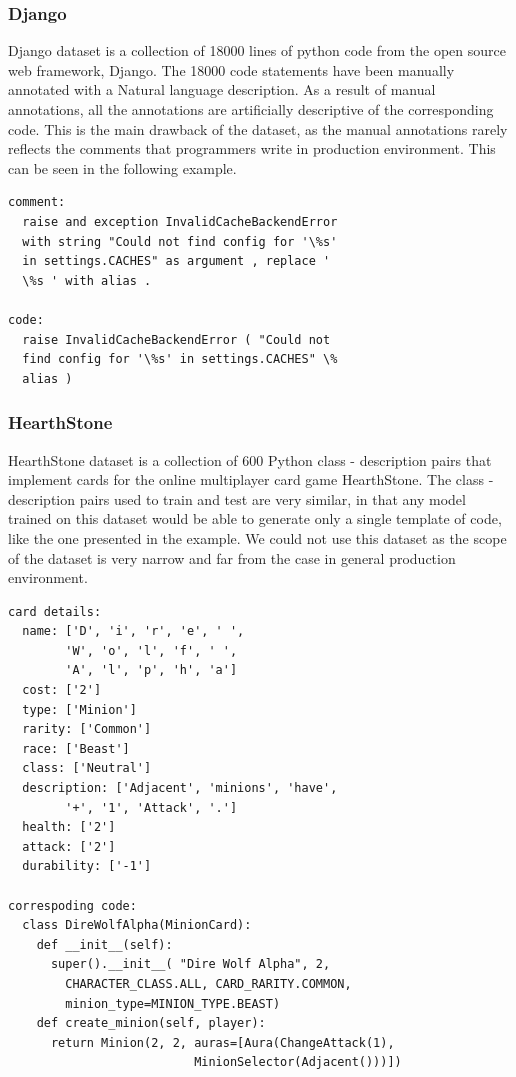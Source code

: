 \documentclass{IEEEtran}
\begin{document}
        \subsubsection{Django}
        Django dataset is a collection of 18000 lines of python code from the open source
        web framework, Django. The 18000 code statements have been manually annotated
        with a Natural language description. As a result of manual annotations, all the
        annotations are artificially descriptive of the corresponding code. This is
        the main drawback of the dataset, as the manual annotations rarely reflects
        the comments that programmers write in production environment. This can be seen
        in the following example.

        \begin{lstlisting}[frame=single,basicstyle=\small]
comment:
  raise and exception InvalidCacheBackendError 
  with string "Could not find config for '\%s' 
  in settings.CACHES" as argument , replace ' 
  \%s ' with alias .

code:
  raise InvalidCacheBackendError ( "Could not 
  find config for '\%s' in settings.CACHES" \% 
  alias )
        \end{lstlisting}

        \subsubsection{HearthStone}
        HearthStone dataset is a collection of 600 Python class - description pairs
        that implement cards for the online multiplayer card game HearthStone.
        The class - description pairs used to train and test are very similar, in that
        any model trained on this dataset would be able to generate only a
        single template of code, like the one presented in the example. We could not
        use this dataset as the scope of the dataset is very narrow and far from the case
        in general production environment. 

        \begin{lstlisting}[frame=single,basicstyle=\scriptsize]
card details:
  name: ['D', 'i', 'r', 'e', ' ', 
        'W', 'o', 'l', 'f', ' ', 
        'A', 'l', 'p', 'h', 'a']
  cost: ['2']
  type: ['Minion']
  rarity: ['Common']
  race: ['Beast']
  class: ['Neutral']
  description: ['Adjacent', 'minions', 'have', 
        '+', '1', 'Attack', '.']
  health: ['2']
  attack: ['2']
  durability: ['-1']

correspoding code:
  class DireWolfAlpha(MinionCard):
    def __init__(self):
      super().__init__( "Dire Wolf Alpha", 2, 
        CHARACTER_CLASS.ALL, CARD_RARITY.COMMON, 
        minion_type=MINION_TYPE.BEAST)
    def create_minion(self, player):
      return Minion(2, 2, auras=[Aura(ChangeAttack(1), 
                          MinionSelector(Adjacent()))])
        \end{lstlisting}
\end{document}
